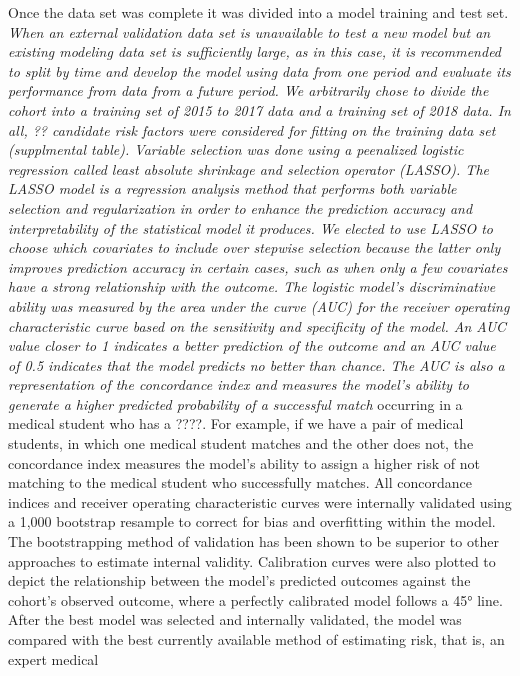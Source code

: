\documentclass[12pt,]{article}
\begin{document}
Once the data set was complete it was divided into a model training and
test set. \emph{When an external validation data set is unavailable to
test a new model but an existing modeling data set is sufficiently
large, as in this case, it is recommended to split by time and develop
the model using data from one period and evaluate its performance from
data from a future period. We arbitrarily chose to divide the cohort
into a training set of 2015 to 2017 data and a training set of 2018
data. In all, ?? candidate risk factors were considered for fitting on
the training data set (supplmental table). Variable selection was done
using a peenalized logistic regression called least absolute shrinkage
and selection operator (LASSO). The LASSO model is a regression analysis
method that performs both variable selection and regularization in order
to enhance the prediction accuracy and interpretability of the
statistical model it produces. We elected to use LASSO to choose which
covariates to include over stepwise selection because the latter only
improves prediction accuracy in certain cases, such as when only a few
covariates have a strong relationship with the outcome. The logistic
model's discriminative ability was measured by the area under the curve
(AUC) for the receiver operating characteristic curve based on the
sensitivity and specificity of the model. An AUC value closer to 1
indicates a better prediction of the outcome and an AUC value of 0.5
indicates that the model predicts no better than chance. The AUC is also
a representation of the concordance index and measures the model's
ability to generate a higher predicted probability of a successful
match} occurring in a medical student who has a ????. For example, if we
have a pair of medical students, in which one medical student matches
and the other does not, the concordance index measures the model's
ability to assign a higher risk of not matching to the medical student
who successfully matches. All concordance indices and receiver operating
characteristic curves were internally validated using a 1,000 bootstrap
resample to correct for bias and overfitting within the model. The
bootstrapping method of validation has been shown to be superior to
other approaches to estimate internal validity. Calibration curves were
also plotted to depict the relationship between the model's predicted
outcomes against the cohort's observed outcome, where a perfectly
calibrated model follows a 45° line. After the best model was selected
and internally validated, the model was compared with the best currently
available method of estimating risk, that is, an expert medical
\end{document}
